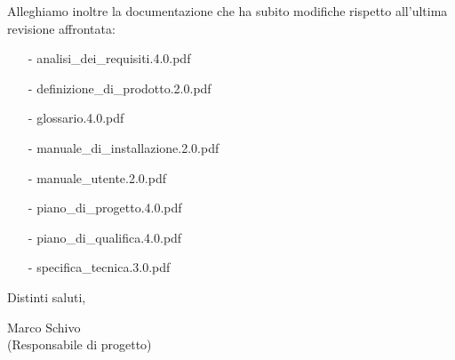 \documentclass[a4paper,10pt]{letter}
\begin{document}
Alleghiamo inoltre la documentazione che ha subito modifiche rispetto all'ultima revisione affrontata:

\begin{itemize}[noitemsep,nolistsep]

\item[-] analisi\_dei\_requisiti.4.0.pdf
\item[-] definizione\_di\_prodotto.2.0.pdf
\item[-] glossario.4.0.pdf
\item[-] manuale\_di\_installazione.2.0.pdf
\item[-] manuale\_utente.2.0.pdf
\item[-] piano\_di\_progetto.4.0.pdf
\item[-] piano\_di\_qualifica.4.0.pdf
\item[-] specifica\_tecnica.3.0.pdf

\end{itemize}

\bigskip
Distinti saluti,\\

\begin{flushright}
\begin{minipage}[t]{.35\textwidth}
Marco Schivo\\
(Responsabile di progetto)
\end{minipage}
\end{flushright}
\end{document}
